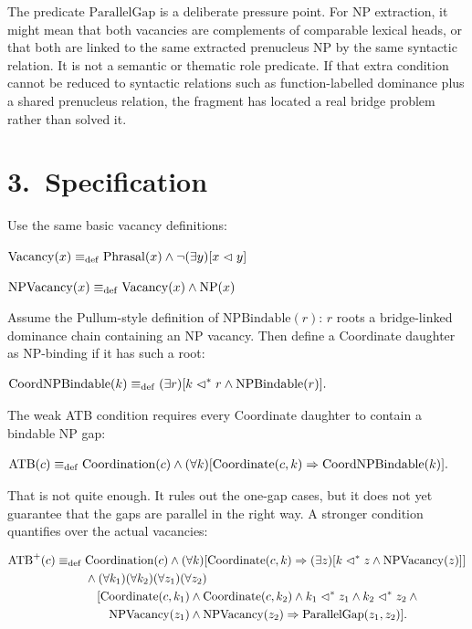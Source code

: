 \documentclass[11pt]{article}
\newcommand{\Vacancy}{\mathrm{Vacancy}}
\newcommand{\NPVac}{\mathrm{NPVacancy}}
\newcommand{\NPBindable}{\mathrm{NPBindable}}
\newcommand{\Coordination}{\Cat{Coordination}}
\newcommand{\Coordinate}{\mathrm{Coordinate}}
\newcommand{\CoordNPBindable}{\mathrm{CoordNPBindable}}
\newcommand{\ATB}{\mathrm{ATB}}
\newcommand{\ParallelGap}{\mathrm{ParallelGap}}
\begin{document}
The predicate $\ParallelGap$ is a deliberate pressure point. For NP extraction,
it might mean that both vacancies are complements of comparable lexical heads,
or that both are linked to the same extracted prenucleus NP by the same
syntactic relation. It is not a semantic or thematic role predicate. If that
extra condition cannot be reduced to syntactic relations such as
function-labelled dominance plus a shared prenucleus relation, the fragment has
located a real bridge problem rather than solved it.

\section*{3.~Specification}

Use the same basic vacancy definitions:

\ea
$\Vacancy(x) \defas \Phrasal(x) \wedge \neg(\exists y)[x \imdom y]$
\z

\ea
$\NPVac(x) \defas \Vacancy(x) \wedge \NP(x)$
\z

Assume the Pullum-style definition of $\NPBindable(r)$: $r$ roots a
bridge-linked dominance chain containing an NP vacancy. Then define a
Coordinate daughter as NP-binding if it has such a root:

\ea
$\begin{aligned}
\CoordNPBindable(k) \defas {} &
  (\exists r)[k \dm r \wedge \NPBindable(r)].
\end{aligned}$\\
\z

The weak ATB condition requires every Coordinate daughter to contain a bindable
NP gap:

\ea
$\begin{aligned}
\ATB(c) \defas {} & \Coordination(c) \wedge
  (\forall k)[\Coordinate(c,k) \Rightarrow \CoordNPBindable(k)].
\end{aligned}$\\
\z

That is not quite enough. It rules out the one-gap cases, but it does not yet
guarantee that the gaps are parallel in the right way. A stronger condition
quantifies over the actual vacancies:

\ea
$\begin{aligned}
\mathrm{ATB}^{+}(c) \defas {} & \Coordination(c) \wedge
  (\forall k)[\Coordinate(c,k) \Rightarrow
    (\exists z)[k \dm z \wedge \NPVac(z)]] \\
& {} \wedge
  (\forall k_1)(\forall k_2)(\forall z_1)(\forall z_2) \\
& \quad [\Coordinate(c,k_1) \wedge \Coordinate(c,k_2) \wedge
    k_1 \dm z_1 \wedge k_2 \dm z_2 \wedge {} \\
& \qquad \NPVac(z_1) \wedge \NPVac(z_2)
    \Rightarrow \ParallelGap(z_1,z_2)].
\end{aligned}$\\
\z
\end{document}
